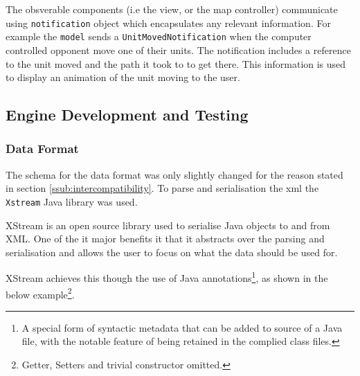 

The obsverable components (i.e the view, or the map controller) communicate using \texttt{notification} object which encapsulates any relevant information. For example the \texttt{model} sends a \texttt{UnitMovedNotification} when the computer controlled opponent move one of their units. The notification includes a reference to the unit moved and the path it took to to get there. This information is used to display an animation of the unit moving to the user.

\clearpage
\subsection{Engine Development and Testing}
\label{sub:engine_development_and_testing}

\subsubsection{Data Format}
The schema for the data format was only slightly changed for the reason stated in section \ref{ssub:intercompatibility}. To parse and serialisation the xml  the \texttt{Xstream} Java library was used.

XStream is an open source library used to serialise Java objects to and from XML. One of the it major benefits it that it abstracts over the parsing and serialisation and allows the user to focus on what the data should be used for. 

XStream achieves this though the use of Java annotations\footnote{A special form of syntactic metadata that can be added to source of a Java file, with the notable feature of being retained in the complied class files.	}, as shown in the below example\footnote{Getter, Setters and trivial constructor omitted.}.

